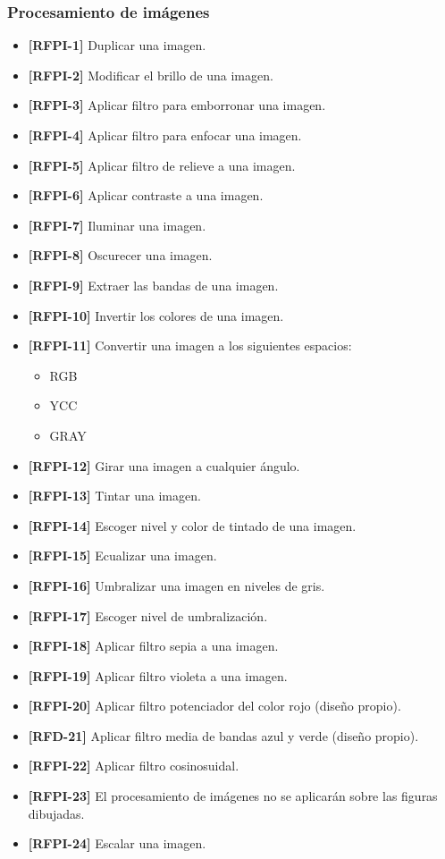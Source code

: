 \subsubsection{Procesamiento de imágenes}
\begin{itemize}
\item{\textbf{[RFPI-1]} Duplicar una imagen.}
\item{\textbf{[RFPI-2]} Modificar el brillo de una imagen.}
\item{\textbf{[RFPI-3]} Aplicar filtro para emborronar una imagen.}
\item{\textbf{[RFPI-4]} Aplicar filtro para enfocar una imagen.}
\item{\textbf{[RFPI-5]} Aplicar filtro de relieve a una imagen.}
\item{\textbf{[RFPI-6]} Aplicar contraste a una imagen.}
\item{\textbf{[RFPI-7]} Iluminar una imagen.}
\item{\textbf{[RFPI-8]} Oscurecer una imagen.}
\item{\textbf{[RFPI-9]} Extraer las bandas de una imagen.}
\item{\textbf{[RFPI-10]} Invertir los colores de una imagen.}
\item{\textbf{[RFPI-11]} Convertir una imagen a los siguientes espacios:
\begin{itemize}
\item{RGB}
\item{YCC}
\item{GRAY}
\end{itemize}
}
\item{\textbf{[RFPI-12]} Girar una imagen a cualquier ángulo.}
\item{\textbf{[RFPI-13]} Tintar una imagen.}
\item{\textbf{[RFPI-14]} Escoger nivel y color de tintado de una imagen.}
\item{\textbf{[RFPI-15]} Ecualizar una imagen.}
\item{\textbf{[RFPI-16]} Umbralizar una imagen en niveles de gris.}
\item{\textbf{[RFPI-17]} Escoger nivel de umbralización.}
\item{\textbf{[RFPI-18]} Aplicar filtro sepia a una imagen.}
\item{\textbf{[RFPI-19]} Aplicar filtro violeta a una imagen.}
\item{\textbf{[RFPI-20]} Aplicar filtro potenciador del color rojo (diseño propio).}
\item{\textbf{[RFD-21]} Aplicar filtro media de bandas azul y verde (diseño propio).}
\item{\textbf{[RFPI-22]} Aplicar filtro cosinosuidal.}
\item{\textbf{[RFPI-23]} El procesamiento de imágenes no se aplicarán sobre las figuras dibujadas.}
\item{\textbf{[RFPI-24]} Escalar una imagen.}
\end{itemize}
